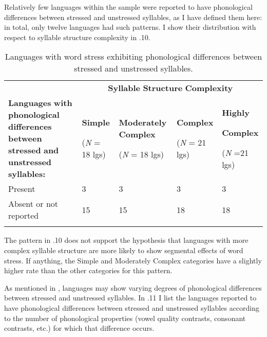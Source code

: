  Relatively few languages within the sample were reported to have phonological differences between stressed and unstressed syllables, as I have defined them here: in total, only twelve languages had such patterns. I show their distribution with respect to syllable structure complexity in .10.

\begin{table}
\begin{tabularx}{\textwidth}{XXXXX}
\lsptoprule
 & \multicolumn{4}{c}{ \textbf{Syllable} \textbf{Structure} \textbf{Complexity}}\\
 \textbf{Languages} \textbf{with} \textbf{phonological} \textbf{differences} \textbf{between} \textbf{stressed} \textbf{and} \textbf{unstressed} \textbf{syllables:} & { \textbf{Simple}}

 (\textit{N} = 18 lgs) & { \textbf{Moderately} \textbf{Complex}}

 (\textit{N} = 18 lgs) & { \textbf{Complex}}

 (\textit{N} = 21 lgs) & { \textbf{Highly} }

{ \textbf{Complex}}

 (\textit{N} =21 lgs)\\
 Present & 3 & 3 & 3 & 3\\
 Absent or not reported & 15 & 15 & 18 & 18\\
\lspbottomrule
\end{tabularx}
\caption{\label{5.10}Languages with word stress exhibiting phonological differences between stressed and unstressed syllables.}
\end{table}

  The pattern in .10 does not support the hypothesis that languages with more complex syllable structure are more likely to show segmental effects of word stress. If anything, the Simple and Moderately Complex categories have a slightly higher rate than the other categories for this pattern.

  As mentioned in , languages may show varying degrees of phonological differences between stressed and unstressed syllables. In .11 I list the languages reported to have phonological differences between stressed and unstressed syllables according to the number of phonological properties (vowel quality contrasts, consonant contrasts, etc.) for which that difference occurs.

